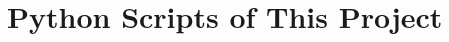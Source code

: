 \documentclass[../../ECE459FinalProjectReport.tex]{subfiles}
\begin{document}
\chapter{Python Scripts of This Project}
\end{document}
